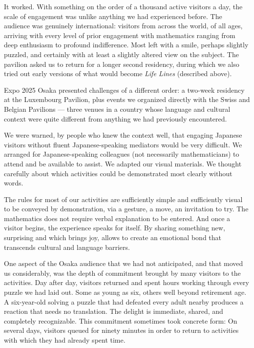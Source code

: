 \documentclass{notices}
\begin{document}
It worked. With something on the order of a thousand active visitors a day, the scale of engagement was unlike anything we had experienced before. The audience was genuinely international: visitors from across the world, of all ages, arriving with every level of prior engagement with mathematics ranging from deep enthusiasm to profound indifference. Most left with a smile, perhaps slightly puzzled, and certainly with at least a slightly altered view on the subject. The pavilion asked us to return for a longer second residency, during which we also tried out early versions of what would become \textit{Life Lines} (described above).

Expo 2025 Osaka presented challenges of a different order: a two-week residency at the Luxembourg Pavilion, plus events we organized directly with the Swiss and Belgian Pavilions --- three venues in a country whose language and cultural context were quite different from anything we had previously encountered.

We were warned, by people who knew the context well, that engaging Japanese visitors without fluent Japanese-speaking mediators would be very difficult. We arranged for Japanese-speaking colleagues (not necessarily mathematicians) to attend and be available to assist. We adapted our visual materials. We thought carefully about which activities could be demonstrated most clearly without words.

The rules for most of our activities are sufficiently simple and sufficiently visual to be conveyed by demonstration, via a gesture, a move, an invitation to try.  The mathematics does not require verbal explanation to be entered. And once a visitor begins, the experience speaks for itself. By sharing something new, surprising and which brings joy, allows to create an emotional bond that transcends cultural and language barriers.

One aspect of the Osaka audience that we had not anticipated, and that moved us considerably, was the depth of commitment brought by many visitors to the activities. Day after day, visitors returned and spent hours working through every puzzle we had laid out. Some as young as six, others well beyond retirement age. A six-year-old solving a puzzle that had defeated every adult nearby produces a reaction that needs no translation. The delight is immediate, shared, and completely recognizable. This commitment sometimes took concrete form: On several days, visitors queued for ninety minutes in order to return to activities with which they had already spent time.
\end{document}
